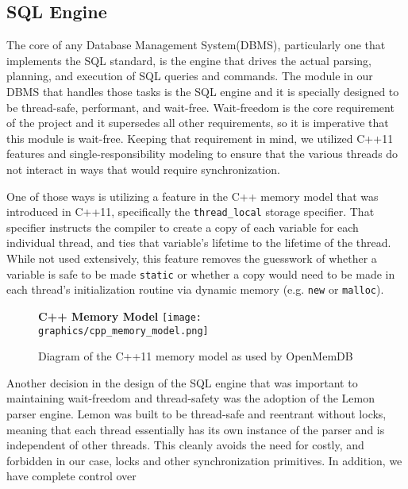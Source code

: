 \documentclass[letterpaper, 12pt]{article}
\begin{document}
  \subsection{SQL Engine}
  The core of any Database Management System(DBMS), particularly one that implements the SQL standard, is the
  engine that drives the actual parsing, planning, and execution of SQL queries and commands.
  The module in our DBMS that handles those tasks is the SQL engine and it is specially designed to 
  be thread-safe, performant, and wait-free. Wait-freedom is the core requirement of the project
  and it supersedes all other requirements, so it is imperative that this module is wait-free. Keeping
  that requirement in mind, we utilized C++11 features and single-responsibility modeling to 
  ensure that the various threads do not interact in ways that would require synchronization.
  \par\vspace{\baselineskip}
  One of those ways is utilizing a feature in the C++ memory model that was introduced in C++11, specifically
  the \lstinline|thread_local| storage specifier. That specifier instructs the compiler
  to create a copy of each variable for each individual thread, and ties that variable's lifetime
  to the lifetime of the thread. While not used extensively, this feature removes the guesswork 
  of whether a variable is safe to be made \lstinline|static| or whether a copy
  would need to be made in each thread's initialization routine via dynamic memory (e.g.
  \lstinline|new| or \lstinline|malloc|).
  \par\vspace{\baselineskip}
  \begin{figure}
   \centering
    \textbf{C++ Memory Model}
    \texttt{[image: graphics/cpp\_memory\_model.png]}
    \caption{Diagram of the C++11 memory model as used by OpenMemDB}
  \end{figure}
  \par\vspace{\baselineskip}
  Another decision in the design of the SQL engine that was important to maintaining wait-freedom and 
  thread-safety was the adoption of the Lemon parser engine. Lemon was built to be thread-safe and 
  reentrant without locks, meaning that each thread essentially has its own instance of the parser
  and is independent of other threads. This cleanly avoids the need for costly, and forbidden
  in our case, locks and other synchronization primitives. In addition, we have complete control over
\end{document}
